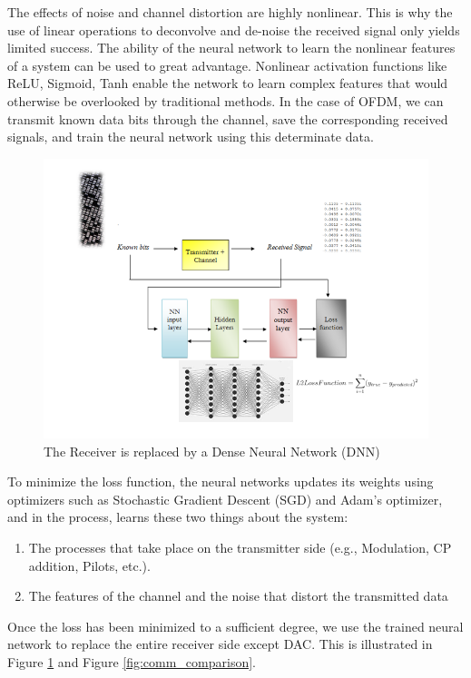 The effects of noise and channel distortion are highly nonlinear. This is why the use of linear operations to deconvolve and de-noise the received signal only yields limited success. The ability of the neural network to learn the nonlinear features of a system can be used to great advantage. Nonlinear activation functions like ReLU, Sigmoid, Tanh enable the network to learn complex features that would otherwise be overlooked by traditional methods. In the case of OFDM, we can transmit known data bits through the channel, save the corresponding received signals, and train the neural network using this determinate data.
\begin{figure}[htbp]
  \centering
  \includegraphics[width=\textwidth]{./Figures/comm_dnn.png}
  \caption{The Receiver is replaced by a Dense Neural Network (DNN)}
  \label{fig:comm_dnn}
\end{figure}
To minimize the loss function, the neural networks updates its weights using optimizers such as Stochastic Gradient Descent (SGD) and Adam’s optimizer, and in the process, learns these two things about the system:
\begin{enumerate}
\item The processes that take place on the transmitter side (e.g., Modulation, CP addition, Pilots, etc.).
\item The features of the channel and the noise that distort the transmitted data
\end{enumerate}
Once the loss has been minimized to a sufficient degree, we use the trained neural network to replace the entire receiver side except DAC. This is illustrated in Figure \ref{fig:comm_dnn} and Figure \ref{fig:comm_comparison}.\\
